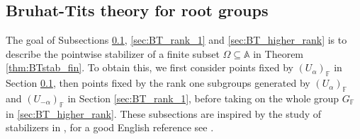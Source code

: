 \documentclass[12pt]{amsart}
\newcommand{\F}{\mathbb{F} }
\newcommand{\frakg}{\mathfrak{g}}
\newcommand{\A}{\mathbb{A}}
\numberwithin{equation}{section}
\theoremstyle{remark} %
\begin{document}
%	


\subsection{Bruhat-Tits theory for root groups} \label{sec:BT_root_groups}
The goal of Subsections \ref{sec:BT_root_groups}, \ref{sec:BT_rank_1} and \ref{sec:BT_higher_rank} is to describe the pointwise stabilizer of a finite subset $\Omega \subseteq \A$ in Theorem \ref{thm:BTstab_fin}. To obtain this, we first consider points fixed by $(U_\alpha)_\F$ in Section \ref{sec:BT_root_groups}, then points fixed by the rank one subgroups generated by $(U_\alpha)_\F$ and $(U_{-\alpha})_\F$ in Section \ref{sec:BT_rank_1}, before taking on the whole group $G_\F$ in \ref{sec:BT_higher_rank}. These subsections are inspired by the study of stabilizers in \cite[Sections 6 and 7]{BrTi}, for a good English reference see \cite{Lan96}. 
\end{document}
